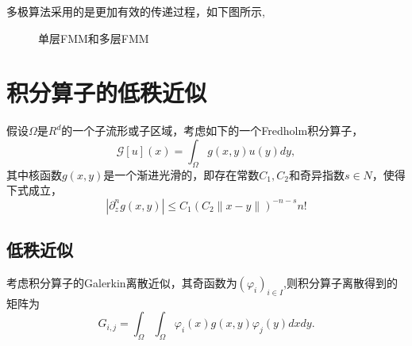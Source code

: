 多极算法采用的是更加有效的传递过程，如下图所示,


\begin{figure}[htbp]
	\begin{center}
		\caption{单层FMM和多层FMM}
\end{center}
\end{figure}


\section{积分算子的低秩近似}

假设$\Omega$是$R^d$的一个子流形或子区域，考虑如下的一个Fredholm积分算子，
\begin{equation}
	\mathcal{G}[u](x)= \int_{\Omega}g(x,y)u(y)dy,
\end{equation}
其中核函数$g(x,y)$是一个渐进光滑的，即存在常数$C_1,C_2$和奇异指数$s \in N$，使得下式成立，
\begin{equation}
	|\partial_{z}^{n}g(x,y)| \le C_1 (C_2 \| x-y \|)^{-n-s}n!
\end{equation}

\subsection{低秩近似}
考虑积分算子的Galerkin离散近似，其奇函数为$(\varphi_i)_{i \in I}$,则积分算子离散得到的矩阵为
\begin{equation}
	G_{i,j} = \int_{\Omega}\int_{\Omega}\varphi_i(x)g(x,y)\varphi_j(y) dxdy.
\end{equation}

